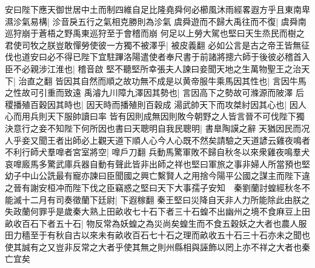 安曰陛下應天御世居中土而制四維自足比隆堯舜何必櫛風沐雨經畧遐方乎且東南卑濕沴氣易構|{
	沴音戾五行之氣相克勝則為沴氣}
虞舜遊而不歸大禹往而不復|{
	虞舜南巡狩崩于蒼梧之野禹東巡狩至于會稽而崩}
何足以上勞大駕也堅曰天生烝民而樹之君使司牧之朕豈敢憚勞使彼一方獨不被澤乎|{
	被皮義翻}
必如公言是古之帝王皆無征伐也道安曰必不得已陛下宜駐蹕洛陽遣使者奉尺書于前諸將摠六師于後彼必稽首入臣不必親涉江淮也|{
	稽音啟}
堅不聽堅所幸張夫人諫曰妾聞天地之生萬物聖王之治天下|{
	治直之翻}
皆因其自然而順之故功無不成是以黄帝服牛乘馬因其性也|{
	言因牛馬之性故可引重而致遠}
禹濬九川障九澤因其勢也|{
	言因高下之勢故可滌源而陂澤}
后稷播殖百穀因其時也|{
	因天時而播殖則百穀成}
湯武帥天下而攻桀紂因其心也|{
	因人心而用兵則天下服帥讀曰率}
皆有因則成無因則敗今朝野之人皆言晉不可伐陛下獨決意行之妾不知陛下何所因也書曰天聰明自我民聰明|{
	書臯陶謨之辭}
天猶因民而况人乎妾又聞王者出師必上觀天道下順人心今人心既不然矣請驗之天道諺云雞夜鳴者不利行師犬羣嘷者宮室將空|{
	嘷戶刀翻}
兵動馬驚軍敗不歸自秋冬以來衆雞夜鳴羣犬哀嘷廄馬多驚武庫兵器自動有聲此皆非出師之祥也堅曰軍旅之事非婦人所當預也堅幼子中山公詵最有寵亦諫曰臣聞國之興亡繫賢人之用捨今陽平公國之謀主而陛下違之晉有謝安桓冲而陛下伐之臣竊惑之堅曰天下大事孺子安知　秦劉蘭討蝗經秋冬不能滅十二月有司奏徵蘭下廷尉|{
	下遐稼翻}
秦王堅曰災降自天非人力所能除此由朕之失政蘭何罪乎是歲秦大熟上田畝收七十石下者三十石蝗不出幽州之境不食麻豆上田畝收百石下者五十石|{
	物反常為妖蝗之為災尚矣蝗生而不食五穀妖之大者也農人服田力穡至于有秋自古以來未有畝收百石七十石之理而畝收五十石三十石亦未之聞也使其誠有之又豈非反常之大者乎使其無之則州縣相與誣飾以罔上亦不祥之大者也秦亡宜矣}


